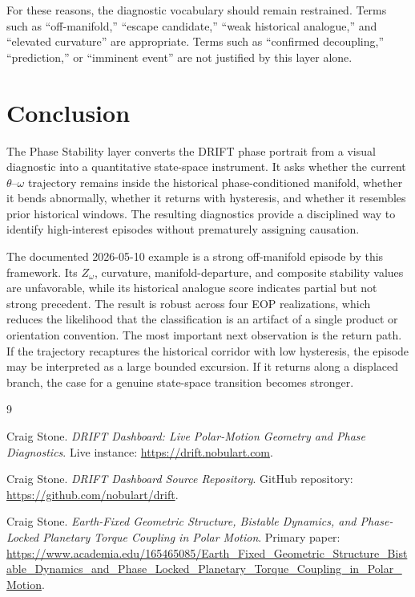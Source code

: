 \documentclass[11pt]{article}
\begin{document}
For these reasons, the diagnostic vocabulary should remain restrained. Terms such as ``off-manifold,'' ``escape candidate,'' ``weak historical analogue,'' and ``elevated curvature'' are appropriate. Terms such as ``confirmed decoupling,'' ``prediction,'' or ``imminent event'' are not justified by this layer alone.

\section{Conclusion}

The Phase Stability layer converts the DRIFT phase portrait from a visual diagnostic into a quantitative state-space instrument. It asks whether the current \(\theta\)--\(\omega\) trajectory remains inside the historical phase-conditioned manifold, whether it bends abnormally, whether it returns with hysteresis, and whether it resembles prior historical windows. The resulting diagnostics provide a disciplined way to identify high-interest episodes without prematurely assigning causation.

The documented 2026-05-10 example is a strong off-manifold episode by this framework. Its \(Z_{\omega}\), curvature, manifold-departure, and composite stability values are unfavorable, while its historical analogue score indicates partial but not strong precedent. The result is robust across four EOP realizations, which reduces the likelihood that the classification is an artifact of a single product or orientation convention. The most important next observation is the return path. If the trajectory recaptures the historical corridor with low hysteresis, the episode may be interpreted as a large bounded excursion. If it returns along a displaced branch, the case for a genuine state-space transition becomes stronger.

\begin{thebibliography}{9}

Craig Stone.
\newblock \textit{DRIFT Dashboard: Live Polar-Motion Geometry and Phase Diagnostics}.
\newblock Live instance: \url{https://drift.nobulart.com}.

Craig Stone.
\newblock \textit{DRIFT Dashboard Source Repository}.
\newblock GitHub repository: \url{https://github.com/nobulart/drift}.

Craig Stone.
\newblock \textit{Earth-Fixed Geometric Structure, Bistable Dynamics, and Phase-Locked Planetary Torque Coupling in Polar Motion}.
\newblock Primary paper: \url{https://www.academia.edu/165465085/Earth_Fixed_Geometric_Structure_Bistable_Dynamics_and_Phase_Locked_Planetary_Torque_Coupling_in_Polar_Motion}.

\end{thebibliography}
\end{document}
